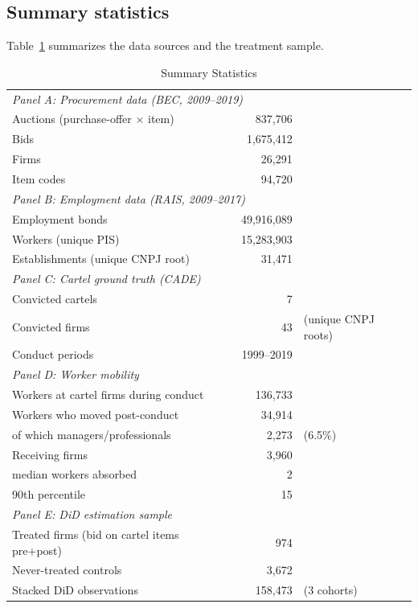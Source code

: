 \subsection{Summary statistics}

Table~\ref{tab:summary} summarizes the data sources and the treatment sample.

\begin{table}[htbp]
\centering
\caption{Summary Statistics}\label{tab:summary}
\begin{tabular}{lrl}
\toprule
\multicolumn{3}{l}{\emph{Panel A: Procurement data (BEC, 2009--2019)}} \\[3pt]
Auctions (purchase-offer $\times$ item) & 837{,}706 & \\
Bids & 1{,}675{,}412 & \\
Firms & 26{,}291 & \\
Item codes & 94{,}720 & \\[6pt]
\multicolumn{3}{l}{\emph{Panel B: Employment data (RAIS, 2009--2017)}} \\[3pt]
Employment bonds & 49{,}916{,}089 & \\
Workers (unique PIS) & 15{,}283{,}903 & \\
Establishments (unique CNPJ root) & 31{,}471 & \\[6pt]
\multicolumn{3}{l}{\emph{Panel C: Cartel ground truth (CADE)}} \\[3pt]
Convicted cartels & 7 & \\
Convicted firms & 43 & (unique CNPJ roots) \\
Conduct periods & 1999--2019 & \\[6pt]
\multicolumn{3}{l}{\emph{Panel D: Worker mobility}} \\[3pt]
Workers at cartel firms during conduct & 136{,}733 & \\
Workers who moved post-conduct & 34{,}914 & \\
\quad of which managers/professionals & 2{,}273 & (6.5\%) \\
Receiving firms & 3{,}960 & \\
\quad median workers absorbed & 2 & \\
\quad 90th percentile & 15 & \\[6pt]
\multicolumn{3}{l}{\emph{Panel E: DiD estimation sample}} \\[3pt]
Treated firms (bid on cartel items pre+post) & 974 & \\
Never-treated controls & 3{,}672 & \\
Stacked DiD observations & 158{,}473 & (3 cohorts) \\

\end{tabular}
\end{table}
